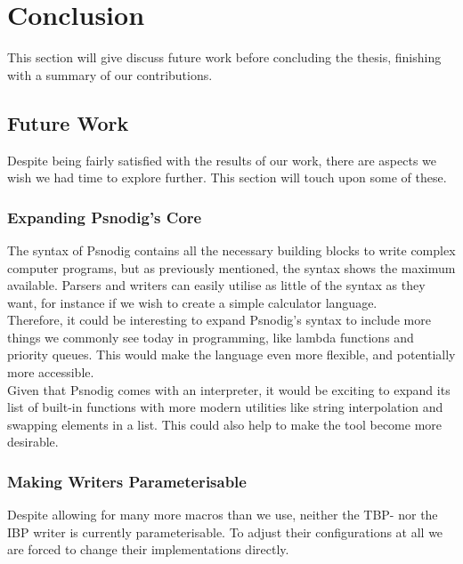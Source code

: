 \chapter{Conclusion}

This section will give discuss future work before concluding the thesis, finishing with a summary of our contributions.

\section{Future Work}

Despite being fairly satisfied with the results of our work, there are aspects we wish we had time to explore further. This section will touch upon some of these.

\subsection{Expanding Psnodig's Core}

The syntax of Psnodig contains all the necessary building blocks to write complex computer programs, but as previously mentioned, the syntax shows the maximum available. Parsers and writers can easily utilise as little of the syntax as they want, for instance if we wish to create a simple calculator language. \\

Therefore, it could be interesting to expand Psnodig's syntax to include more things we commonly see today in programming, like lambda functions and priority queues. This would make the language even more flexible, and potentially more accessible. \\

Given that Psnodig comes with an interpreter, it would be exciting to expand its list of built-in functions with more modern utilities like string interpolation and swapping elements in a list. This could also help to make the tool become more desirable.

\subsection{Making Writers Parameterisable}

Despite allowing for many more macros than we use, neither the TBP- nor the IBP writer is currently parameterisable. To adjust their configurations at all we are forced to change their implementations directly. \\

